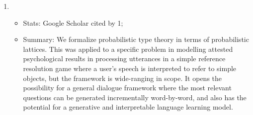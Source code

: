 \documentclass[12pt]{article}
\begin{document}
\begin{enumerate}
\item{}
\begin{itemize}
\item[] Stats: Google Scholar cited by 1;
\item[] Summary: We formalize probabilistic type theory in terms of probabilistic lattices. This was applied to a specific problem in modelling attested psychological results in processing utterances in a simple reference resolution game where a user's speech is interpreted to refer to simple objects, but the framework is wide-ranging in scope. It opens the possibility for a general dialogue framework where the most relevant questions can be generated incrementally word-by-word, and also has the potential for a generative and interpretable language learning model.
\end{itemize}

\end{enumerate}



\end{document}
